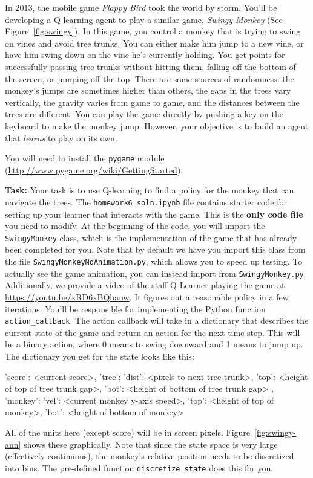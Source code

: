 \documentclass[submit]{../harvardml}
\begin{document}
\begin{problem}
  In 2013, the mobile game \emph{Flappy Bird} took the world by storm. You'll be developing a Q-learning agent to play a similar game, \emph{Swingy Monkey} (See Figure~\ref{fig:swingy}).  In this game, you control a monkey that is trying to swing on vines and avoid tree trunks.  You can either make him jump to a new vine, or have him swing down on the vine he's currently holding.  You get points for successfully passing tree trunks without hitting them, falling off the bottom of the screen, or jumping off the top.  There are some sources of randomness: the monkey's jumps are sometimes higher than others, the gaps in the trees vary vertically, the gravity varies from game to game, and the distances between the trees are different.  You can play the game directly by pushing a key on the keyboard to make the monkey jump.  However, your objective is to build an agent that \emph{learns} to play on its own. 
  
   You will need to install the \verb|pygame| module
  (\url{http://www.pygame.org/wiki/GettingStarted}).
  

\textbf{Task:}
Your task is to use Q-learning to find a policy for the monkey that can navigate the trees.  The \verb|homework6_soln.ipynb| file contains starter code for setting up your learner that interacts with the game. This is the \textbf{only code file} you need to modify. At the beginning of the code, you will import the \verb|SwingyMonkey| class, which is the implementation of the game that has already been completed for you. Note that by default we have you import this class from the file \verb|SwingyMonkeyNoAnimation.py|, which allows you to speed up testing. To actually see the game animation, you can instead import from \verb|SwingyMonkey.py|. Additionally, we provide a video of the staff Q-Learner playing the game at \url{https://youtu.be/xRD6xBQbauw}.  It figures out a reasonable policy in a few iterations.
You'll be responsible for implementing the Python function  \verb|action_callback|. The action callback will take in a dictionary that describes the current state of the game and return an action for the next time step.  This will be a binary action, where 0 means to swing downward and 1 means to jump up.  The dictionary you get for the state looks like this:
\begin{csv}
{ 'score': <current score>,
  'tree': { 'dist': <pixels to next tree trunk>,
            'top':  <height of top of tree trunk gap>,
            'bot':  <height of bottom of tree trunk gap> },
  'monkey': { 'vel': <current monkey y-axis speed>,
              'top': <height of top of monkey>,
              'bot': <height of bottom of monkey> }}
\end{csv}
All of the units here (except score) will be in screen pixels. Figure~\ref{fig:swingy-ann} shows these graphically. 
Note that since the state space is very large (effectively continuous), the monkey's relative position needs to be discretized into bins. The pre-defined function \verb|discretize_state| does this for you.


\end{problem}
\end{document}

